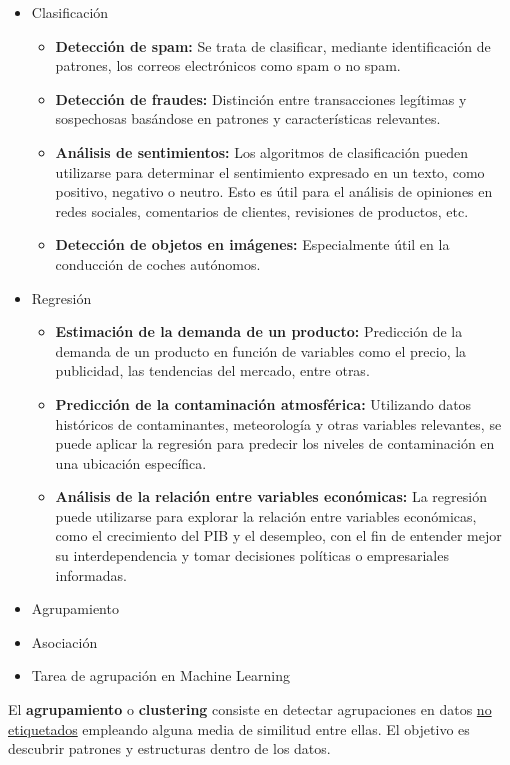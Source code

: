 \begin{itemize}[label=\color{lightblue}\textbullet]
\item Clasificación
\begin{itemize}[label=\color{lightblue}$\to$]
\item \textbf{Detección de spam:} Se trata de clasificar, mediante identificación de patrones, los correos electrónicos como spam o no spam.
\item \textbf{Detección de fraudes:} Distinción entre transacciones legítimas y sospechosas basándose en patrones y características relevantes.
\item \textbf{Análisis de sentimientos:} Los algoritmos de clasificación pueden utilizarse para determinar el sentimiento expresado en un texto, como positivo, negativo o neutro. Esto es útil para el análisis de opiniones en redes sociales, comentarios de clientes, revisiones de productos, etc.
\item \textbf{Detección de objetos en imágenes:} Especialmente útil en la conducción de coches autónomos.
\end{itemize}
\item Regresión
\begin{itemize}[label=\color{lightblue}$\to$]
\item \textbf{Estimación de la demanda de un producto:} Predicción de la demanda de un producto en función de variables como el precio, la publicidad, las tendencias del mercado, entre otras.
\item \textbf{Predicción de la contaminación atmosférica:} Utilizando datos históricos de contaminantes, meteorología y otras variables relevantes, se puede aplicar la regresión para predecir los niveles de contaminación en una ubicación específica.
\item \textbf{Análisis de la relación entre variables económicas:} La regresión puede utilizarse para explorar la relación entre variables económicas, como el crecimiento del PIB y el desempleo, con el fin de entender mejor su interdependencia y tomar decisiones políticas o empresariales informadas.
\end{itemize}
\item Agrupamiento
\item Asociación
\end{itemize}
\begin{itemize}[label=\color{red}\textbullet, leftmargin=*]
	\item \color{lightblue}Tarea de agrupación en Machine Learning
\end{itemize}
El \textbf{agrupamiento} o \textbf{clustering} consiste en detectar agrupaciones en datos \underline{no etiquetados} empleando alguna media  de similitud entre ellas. El objetivo es descubrir patrones y estructuras dentro de los datos.

